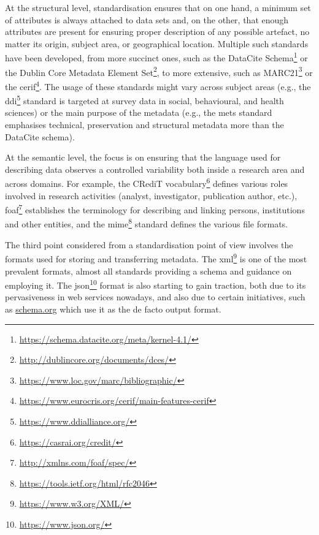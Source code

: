 At the structural level, standardisation ensures that on one hand, a minimum set of attributes is always attached to data sets and, on the other, that enough attributes are present for ensuring proper description of any possible artefact, no matter its origin, subject area, or geographical location. Multiple such standards have been developed, from more succinct ones, such as the DataCite Schema\footnote{\url{https://schema.datacite.org/meta/kernel-4.1/}} or the Dublin Core Metadata Element Set\footnote{\url{http://dublincore.org/documents/dces/}}, to more extensive, such as MARC21\footnote{\url{https://www.loc.gov/marc/bibliographic/}} or the \gls{cerif}\footnote{\url{https://www.eurocris.org/cerif/main-features-cerif}}. The usage of these standards might vary across subject areas (e.g., the \gls{ddi}\footnote{\url{https://www.ddialliance.org/}} standard is targeted at survey data in social, behavioural, and health sciences) or the main purpose of the metadata (e.g., the \gls{mets} standard emphasises technical, preservation and structural metadata more than the DataCite schema).

At the semantic level, the focus is on ensuring that the language used for describing data observes a controlled variability both inside a research area and across domains. For example, the CRediT vocabulary\footnote{\url{https://casrai.org/credit/}} defines various roles involved in research activities (analyst, investigator, publication author, etc.), \gls{foaf}\footnote{\url{http://xmlns.com/foaf/spec/}} establishes the terminology for describing and linking persons, institutions and other entities, and the \gls{mime}\footnote{\url{https://tools.ietf.org/html/rfc2046}} standard defines the various file formats.

The third point considered from a standardisation point of view involves the formats used for storing and transferring metadata. The \gls{xml}\footnote{\url{https://www.w3.org/XML/}} is one of the most prevalent formats, almost all standards providing a schema and guidance on employing it. The \gls{json}\footnote{\url{https://www.json.org/}} format is also starting to gain traction, both due to its pervasiveness in web services nowadays, and also due to certain initiatives, such as \url{schema.org} which use it as the de facto output format.

